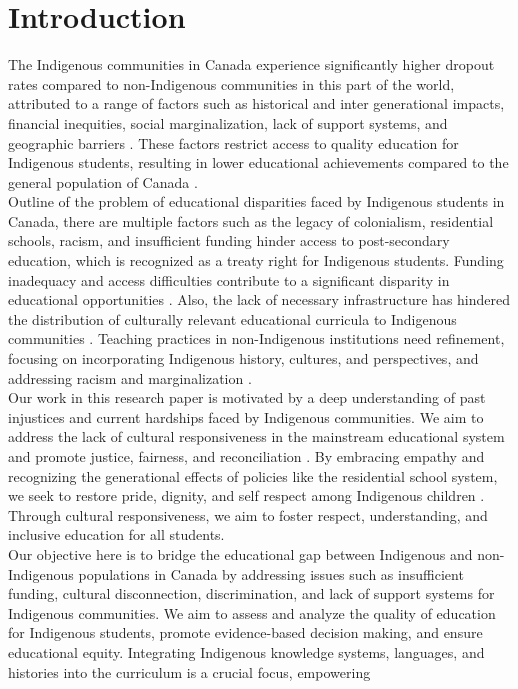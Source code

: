 \documentclass[final,12p,twocolumn]{article}
\begin{document}
\section{Introduction}
The Indigenous communities in Canada experience significantly higher dropout rates compared to non-Indigenous communities in this part of the world, attributed to a range of factors such as historical and inter generational impacts, financial inequities, social marginalization, lack of support systems, and geographic barriers \cite{r3}. These factors restrict access to quality education for Indigenous students, resulting in lower educational achievements compared to the general population of Canada \cite{r4}.\\Outline of the problem of educational disparities faced by Indigenous students in Canada, there are multiple factors such as the legacy of colonialism, residential schools, racism, and insufficient funding hinder access to post-secondary education, which is recognized as a treaty right for Indigenous students. Funding inadequacy and access difficulties contribute to a significant disparity in educational opportunities \cite{r5}. Also, the lack of necessary infrastructure has hindered the distribution of culturally relevant educational curricula to Indigenous communities \cite{r6}. Teaching practices in non-Indigenous institutions need refinement, focusing on incorporating Indigenous history, cultures, and perspectives, and addressing racism and
marginalization \cite{r7}.\\Our work in this research paper is motivated by a deep understanding of past injustices and current hardships faced by Indigenous communities. We aim to address the lack of cultural responsiveness in the mainstream educational system and promote justice, fairness, and reconciliation \cite{r8}. By embracing empathy and recognizing the generational effects of policies like the residential school system, we seek to restore pride, dignity, and self respect among Indigenous children \cite{r9}. Through cultural responsiveness, we aim to foster respect, understanding, and inclusive education for all students.\\Our objective here is to bridge the educational gap between Indigenous and non-Indigenous populations in Canada by addressing issues such as insufficient funding, cultural disconnection, discrimination, and lack of support systems for Indigenous communities. We aim to assess and analyze the quality of education for Indigenous students, promote evidence-based decision making, and ensure educational equity. Integrating Indigenous knowledge systems, languages, and histories into the curriculum is a crucial focus, empowering
\end{document}
